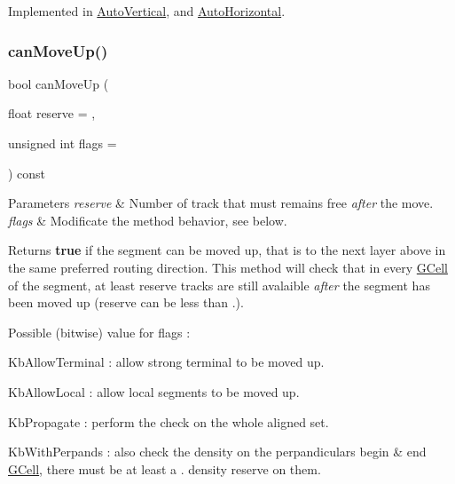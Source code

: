 Implemented in \hyperlink{classKatabatic_1_1AutoVertical_ad0c972e34d6bac47bd9276a7d6e053d8}{Auto\+Vertical}, and \hyperlink{classKatabatic_1_1AutoHorizontal_ad0c972e34d6bac47bd9276a7d6e053d8}{Auto\+Horizontal}.

\mbox{\label{classKatabatic_1_1AutoSegment_a6482341a342eb6e6b3b43f13fd4436f6}} 
\subsubsection{\texorpdfstring{can\+Move\+Up()}{canMoveUp()}}
{\footnotesize\ttfamily bool can\+Move\+Up (\begin{DoxyParamCaption}\item[{float}]{reserve = {},  }\item[{unsigned int}]{flags = {} }\end{DoxyParamCaption}) const}


\begin{DoxyParams}{Parameters}
{\em reserve} & Number of track that must remains free {\itshape after} the move. \\
\hline
{\em flags} & Modificate the method behavior, see below. \\
\hline
\end{DoxyParams}
\begin{DoxyReturn}{Returns}
{\bfseries true} if the segment can be moved up, that is to the next layer above in the same preferred routing direction. This method will check that in every \hyperlink{classKatabatic_1_1GCell}{G\+Cell} of the segment, at least {\ttfamily reserve} tracks are still avalaible {\itshape after} the segment has been moved up ({\ttfamily reserve} can be less than {.}).
\end{DoxyReturn}
Possible (bitwise) value for {\ttfamily flags} \+:
\begin{DoxyItemize}
\item {\ttfamily Kb\+Allow\+Terminal} \+: allow strong terminal to be moved up.
\item {\ttfamily Kb\+Allow\+Local} \+: allow local segments to be moved up.
\item {\ttfamily Kb\+Propagate} \+: perform the check on the whole aligned set.
\item {\ttfamily Kb\+With\+Perpands} \+: also check the density on the perpandiculars begin \& end \hyperlink{classKatabatic_1_1GCell}{G\+Cell}, there must be at least a {.} density reserve on them. 
\end{DoxyItemize}


